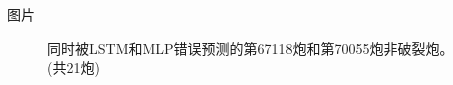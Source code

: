 \documentclass[8pt,compress,t,noamsthm,notheorem,handout,table]{beamer}
\theoremstyle{nonumberplain}%
\theoremstyle{plain}
\begin{document}
\begin{frame}{图片}
\begin{figure}[htbp]
	\centering
	\caption{同时被LSTM和MLP错误预测的第67118炮和第70055炮非破裂炮。(共21炮)}
	\label{fig9}
\end{figure}
\end{frame}
\end{document}
